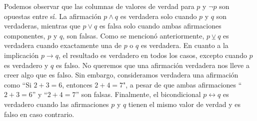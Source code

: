 Podemos observar que las columnas de valores de verdad para $p$ y $\neg p$ son opuestas entre sí. La afirmación $p \land q$ es verdadera solo cuando $p$ y $q$ son verdaderas, mientras que $p \lor q$ es falsa solo cuando ambas afirmaciones componentes, $p$ y $q$, son falsas. Como se mencionó anteriormente, $p \veebar q$ es verdadera cuando exactamente una de $p$ o $q$ es verdadera. En cuanto a la implicación $p \rightarrow q$, el resultado es verdadero en todos los casos, excepto cuando $p$ es verdadero y $q$ es falso. No queremos que una afirmación verdadera nos lleve a creer algo que es falso. Sin embargo, consideramos verdadera una afirmación como “Si $2 + 3 = 6$, entonces $2 + 4 = 7$", a pesar de que ambas afirmaciones “$2 + 3 = 6$” y “$2 + 4 = 7$” son falsas. Finalmente, el bicondicional $p \leftrightarrow q$ es verdadero cuando las afirmaciones $p$ y $q$ tienen el mismo valor de verdad y es falso en caso contrario.


